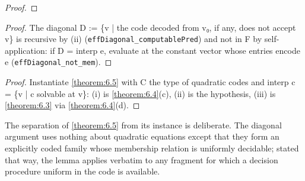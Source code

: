 \begin{proof}
\end{proof}
\begin{proof}
The diagonal D := \{v | the code decoded from v₀, if any, does not accept v\} is recursive by (ii) (\texttt{effDiagonal\_\allowbreak{}computablePred}) and not in F by self-application: if D = interp e, evaluate at the constant vector whose entries encode e (\texttt{effDiagonal\_\allowbreak{}not\_\allowbreak{}mem}).

\end{proof}

\begin{proof}
Instantiate \cref{theorem:6.5} with C the type of quadratic codes and interp c = \{v | c solvable at v\}: (i) is \cref{theorem:6.4}(c), (ii) is the hypothesis, (iii) is \cref{theorem:6.3} via \cref{theorem:6.4}(d).

\end{proof}

The separation of \cref{theorem:6.5} from its instance is deliberate. The diagonal argument uses nothing about quadratic equations except that they form an explicitly coded family whose membership relation is uniformly decidable; stated that way, the lemma applies verbatim to any fragment for which a decision procedure uniform in the code is available.

